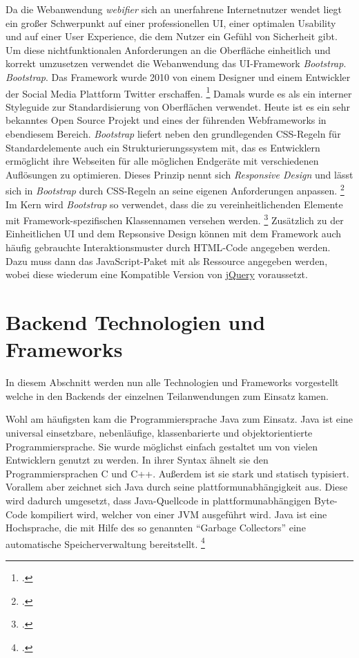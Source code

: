 Da die Webanwendung \textit{webifier} sich an unerfahrene Internetnutzer wendet liegt ein großer Schwerpunkt auf einer professionellen \ac{UI}, einer optimalen Usability und auf einer User Experience, die dem Nutzer ein Gefühl von Sicherheit gibt.
Um diese nichtfunktionalen Anforderungen an die Oberfläche einheitlich und korrekt umzusetzen verwendet die Webanwendung das \ac{UI}-Framework \textit{Bootstrap}.
\textit{Bootstrap}.
Das Framework wurde 2010 von einem Designer und einem Entwickler der Social Media Plattform Twitter erschaffen.
\footcite[Vgl.][1]{bootstrap}
Damals wurde es als ein interner Styleguide zur Standardisierung von Oberflächen verwendet.
Heute ist es ein sehr bekanntes Open Source Projekt und eines der führenden Webframeworks in ebendiesem Bereich.
\textit{Bootstrap} liefert neben den grundlegenden \ac{CSS}-Regeln für Standardelemente auch ein Strukturierungssystem mit, das es Entwicklern ermöglicht ihre Webseiten für alle möglichen Endgeräte mit verschiedenen Auflösungen zu optimieren.
Dieses Prinzip nennt sich \textit{Responsive Design} und lässt sich in \textit{Bootstrap} durch \ac{CSS}-Regeln an seine eigenen Anforderungen anpassen.
\footcite[Vgl.][7\psq]{bootstrap}
Im Kern wird \textit{Bootstrap} so verwendet, dass die zu vereinheitlichenden Elemente mit Framework-spezifischen Klassennamen versehen werden.
\footcite[Vgl.][4]{bootstrap}
Zusätzlich zu der Einheitlichen \ac{UI} und dem Repsonsive Design können mit dem Framework auch häufig gebrauchte Interaktionsmuster durch \ac{HTML}-Code angegeben werden.
Dazu muss dann das JavaScript-Paket mit als Ressource angegeben werden, wobei diese wiederum eine Kompatible Version von \hyperref[par:jquery]{jQuery} voraussetzt.

\section{Backend Technologien und Frameworks}

In diesem Abschnitt werden nun alle Technologien und Frameworks vorgestellt welche in den Backends der einzelnen Teilanwendungen zum Einsatz kamen.

\label{par:java}
Wohl am häufigsten kam die Programmiersprache Java zum Einsatz. Java ist eine universal einsetzbare, nebenläufige, klassenbarierte und objektorientierte Programmiersprache. Sie wurde möglichst einfach gestaltet um von vielen Entwicklern genutzt zu werden. In ihrer Syntax ähnelt sie den Programmiersprachen C und C++. Außerdem ist sie stark und statisch typisiert. Vorallem aber zeichnet sich Java durch seine plattformunabhängigkeit aus. Diese wird dadurch umgesetzt, dass Java-Quellcode in plattformunabhängigen Byte-Code kompiliert wird, welcher von einer \ac{JVM} ausgeführt wird. Java ist eine Hochsprache, die mit Hilfe des so genannten \enquote{Garbage Collectors} eine automatische Speicherverwaltung bereitstellt. \footcite[Vgl.][1]{javaspecification}

